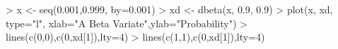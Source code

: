\begin{Schunk}
\begin{Sinput}
> x <- seq(0.001,0.999, by=0.001)
> xd <- dbeta(x, 0.9, 0.9)
> plot(x, xd, type="l", xlab="A Beta Variate",ylab="Probability")
> lines(c(0,0),c(0,xd[1]),lty=4)
> lines(c(1,1),c(0,xd[1]),lty=4)
\end{Sinput}
\end{Schunk}
